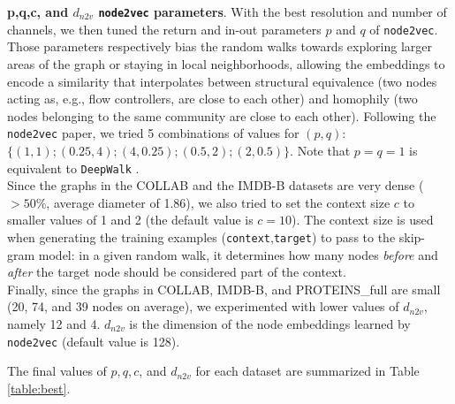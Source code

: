 \documentclass[sigconf]{acmart}
\begin{document}
\textbf{p,q,c, and $d_{n2v}$ \texttt{node2vec} parameters}. With the best resolution and number of channels, we then tuned the return and in-out parameters $p$ and $q$ of \texttt{node2vec}. Those parameters respectively bias the random walks towards exploring larger areas of the graph or staying in local neighborhoods, allowing the embeddings to encode a similarity that interpolates between structural equivalence (two nodes acting as, e.g., flow controllers, are close to each other) and homophily (two nodes belonging to the same community are close to each other). Following the \texttt{node2vec} paper, we tried 5 combinations of values for $(p,q)$: $\big\{(1,1);(0.25,4);(4,0.25);(0.5,2);(2,0.5)\big\}$. Note that $p=q=1$ is equivalent to \texttt{DeepWalk} \citep{perozzi2014deepwalk}.\\
Since the graphs in the COLLAB and the IMDB-B datasets are very dense ($>50\%$, average diameter of 1.86), we also tried to set the context size $c$ to smaller values of 1 and 2 (the default value is $c=10$). The context size is used when generating the training examples (\texttt{context},\texttt{target}) to pass to the skip-gram model: in a given random walk, it determines how many nodes \textit{before} and \textit{after} the target node should be considered part of the context.\\
Finally, since the graphs in COLLAB, IMDB-B, and PROTEINS\_full are small (20, 74, and 39 nodes on average), we experimented with lower values of $d_{n2v}$, namely 12 and 4. $d_{n2v}$ is the dimension of the node embeddings learned by \texttt{node2vec} (default value is 128).

The final values of $p,q,c$, and $d_{n2v}$ for each dataset are summarized in Table \ref{table:best}. 

\begin{table}[!h]
\begin{center}
\end{center}
\captionsetup{justification=centering, size=small}
\caption{Final resolution, number of channels, and $p,q,c$, and $d_{n2v}$ \texttt{node2vec} parameters for each dataset. $^\star$number of channels for node embeddings and continuous node attributes. - means default value(s).}
\label{table:best}
\end{table}
\end{document}
